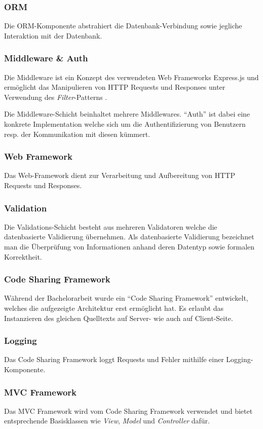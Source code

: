 \subsubsection*{ORM}
Die ORM-Komponente abstrahiert die Datenbank-Verbindung sowie jegliche Interaktion mit der Datenbank.

\subsubsection*{\gls{Middleware} \& Auth}
Die \gls{Middleware} ist ein Konzept des verwendeten Web Frameworks Express.js \cite{Expressjs} und ermöglicht das Manipulieren von HTTP Requests und Responses unter Verwendung des \emph{Filter}-Patterns \cite{POSA2}.

Die Middleware-Schicht beinhaltet mehrere Middlewares. ``Auth'' ist dabei eine konkrete Implementation welche sich um die Authentifizierung von Benutzern resp. der Kommunikation mit diesen kümmert.

\subsubsection*{Web Framework}
Das Web-Framework dient zur Verarbeitung und Aufbereitung von HTTP Requests und Responses.

\subsubsection*{Validation}
Die Validations-Schicht besteht aus mehreren Validatoren welche die datenbasierte Validierung übernehmen. Als datenbasierte Validierung bezeichnet man die Überprüfung von Informationen anhand deren Datentyp sowie formalen Korrektheit.

\subsubsection*{Code Sharing Framework}
Während der Bachelorarbeit wurde ein ``Code Sharing Framework'' entwickelt, welches die aufgezeigte Architektur erst ermöglicht hat. Es erlaubt das Instanzieren des gleichen Quelltexts auf Server- wie auch auf Client-Seite.

\subsubsection*{Logging}
Das Code Sharing Framework loggt Requests und Fehler mithilfe einer Logging-Komponente.

\subsubsection*{MVC Framework}
Das MVC Framework wird vom Code Sharing Framework verwendet und bietet entsprechende Basisklassen wie \emph{View}, \emph{Model} und \emph{Controller} dafür.

